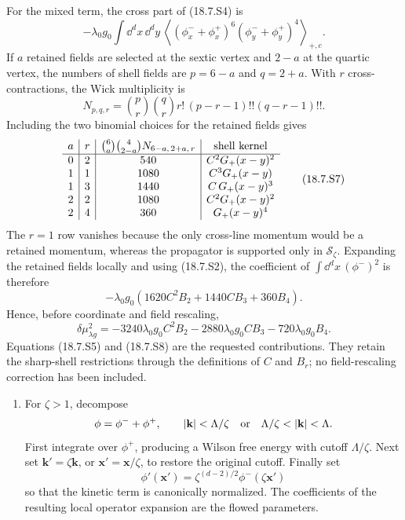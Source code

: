 \begin{enumerate}
\begin{enumerate}
\begin{enumerate}
      For the mixed term, the cross part of (18.7.S4) is
      \[
        -\lambda_0g_0\int \dd^dx\,\dd^dy\,
        \left\langle
          (\phi^-_x+\phi^+_x)^6
          (\phi^-_y+\phi^+_y)^4
        \right\rangle_{+,c}.
      \]
      If \(a\) retained fields are selected at the sextic vertex and
      \(2-a\) at the quartic vertex, the numbers of shell fields are
      \(p=6-a\) and \(q=2+a\).  With \(r\) cross-contractions, the Wick
      multiplicity is
      \[
        N_{p,q,r}
        =\binom pr\binom qr r!\,
          (p-r-1)!!(q-r-1)!! .
        \tag{18.7.S6}
      \]
      Including the two binomial choices for the retained fields gives
      \[
      \begin{array}{c|c|c|c}
        a&r&
        \binom6a\binom4{2-a}N_{6-a,\,2+a,\,r}&
        \hbox{shell kernel}\\ \hline
        0&2&540&C^2G_+(x-y)^2\\
        1&1&1080&C^3G_+(x-y)\\
        1&3&1440&C\,G_+(x-y)^3\\
        2&2&1080&C^2G_+(x-y)^2\\
        2&4&360&G_+(x-y)^4
      \end{array}
      \tag{18.7.S7}
      \]
      The \(r=1\) row vanishes because the only cross-line momentum would
      be a retained momentum, whereas the propagator is supported only in
      \(\mathcal S_\zeta\).  Expanding the retained fields locally and
      using (18.7.S2), the coefficient of
      \(\int \dd^dx\,(\phi^-)^2\) is therefore
      \[
        -\lambda_0g_0
          \left(1620C^2B_2+1440CB_3+360B_4\right).
      \]
      Hence, before coordinate and field rescaling,
      \[
        \boxed{\delta\mu_{\lambda g}^2
          =-3240\lambda_0g_0C^2B_2
           -2880\lambda_0g_0CB_3
           -720\lambda_0g_0B_4.}
        \tag{18.7.S8}
      \]
      Equations (18.7.S5) and (18.7.S8) are the requested contributions.
      They retain the sharp-shell restrictions through the definitions of
      \(C\) and \(B_r\); no field-rescaling correction has been included.
    \end{enumerate}
  \end{enumerate}

  \begin{enumerate}
    \item[(a)]
    For \(\zeta>1\), decompose
    \[
      \phi=\phi^-+\phi^+,\qquad
      |\mathbf k|<\Lambda/\zeta
      \quad\hbox{or}\quad
      \Lambda/\zeta<|\mathbf k|<\Lambda .
    \]
    First integrate over \(\phi^+\), producing a Wilson free energy with
    cutoff \(\Lambda/\zeta\).  Next set
    \(\mathbf k'=\zeta\mathbf k\), or
    \(\mathbf x'=\mathbf x/\zeta\), to restore the original cutoff.
    Finally set
    \[
      \phi'(\mathbf x')
        =\zeta^{(d-2)/2}\phi^-(\zeta\mathbf x')
    \]
    so that the kinetic term is canonically normalized.  The coefficients
    of the resulting local operator expansion are the flowed parameters.


\end{enumerate}
\end{enumerate}
